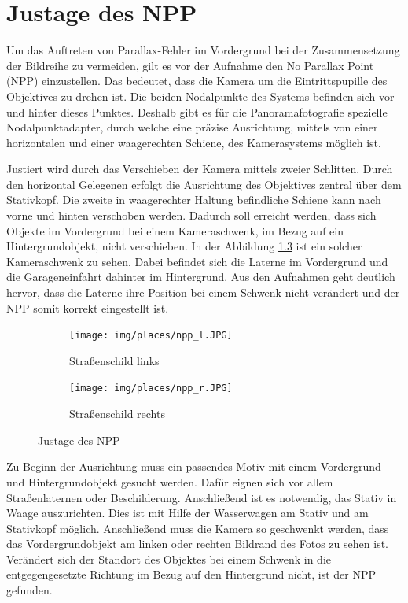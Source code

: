 \documentclass[liststotoc,bibtotoc,fontsize=14pt,]{scrreprt}
\begin{document}
	\chapter{Justage des NPP}
	\label{sec:npp}
	Um das Auftreten von Parallax-Fehler im Vordergrund bei der Zusammensetzung der Bildreihe zu vermeiden, gilt es vor der Aufnahme den No Parallax Point (NPP) einzustellen. Das bedeutet, dass die Kamera um die Eintrittspupille des Objektives zu drehen ist. Die beiden Nodalpunkte des Systems befinden sich vor und hinter dieses Punktes. Deshalb gibt es für die Panoramafotografie spezielle Nodalpunktadapter, durch welche eine präzise Ausrichtung, mittels von einer horizontalen und einer waagerechten Schiene, des Kamerasystems möglich ist.

	\bigskip
	Justiert wird durch das Verschieben der Kamera mittels zweier Schlitten. Durch den horizontal Gelegenen erfolgt die Ausrichtung des Objektives zentral über dem Stativkopf. Die zweite in waagerechter Haltung befindliche Schiene kann nach vorne und hinten verschoben werden. Dadurch soll erreicht werden, dass sich Objekte im Vordergrund bei einem Kameraschwenk, im Bezug auf ein Hintergrundobjekt, nicht verschieben. In der Abbildung \ref{fig:justage} ist ein solcher Kameraschwenk zu sehen. Dabei befindet sich die Laterne im Vordergrund und die Garageneinfahrt dahinter im Hintergrund. Aus den Aufnahmen geht deutlich hervor, dass die Laterne ihre Position bei einem Schwenk nicht verändert und der NPP somit korrekt eingestellt ist. 
	
	\begin{figure}[H]
		\begin{subfigure}[b]{0.5\textwidth}
			\texttt{[image: img/places/npp\_l.JPG]}
			\caption{Straßenschild links}
			\label{fig:npp_l}
		\end{subfigure}
		\hfill
		\begin{subfigure}[b]{0.5\textwidth}
			\texttt{[image: img/places/npp\_r.JPG]}
			\caption{Straßenschild rechts}
			\label{fig:npp_r}
		\end{subfigure}
		\caption{Justage des NPP}
		\label{fig:justage}
	\end{figure}
	\bigskip
	
	Zu Beginn der Ausrichtung muss ein passendes Motiv mit einem Vordergrund- und Hintergrundobjekt gesucht werden. Dafür eignen sich vor allem Straßenlaternen oder Beschilderung. Anschließend ist es notwendig, das Stativ in Waage auszurichten. Dies ist mit Hilfe der Wasserwagen am Stativ und am Stativkopf möglich. Anschließend muss die Kamera so geschwenkt werden, dass das Vordergrundobjekt am linken oder rechten Bildrand des Fotos zu sehen ist. Verändert sich der Standort des Objektes bei einem Schwenk in die entgegengesetzte Richtung im Bezug auf den Hintergrund nicht, ist der NPP gefunden. 
	
\end{document}

